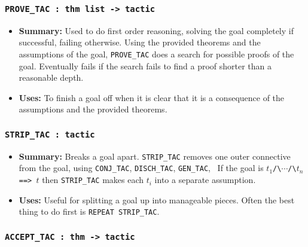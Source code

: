 \subsubsection{\tt PROVE\_TAC : thm list -> tactic}

\begin{itemize}
\item {\bf Summary:} Used to do first order reasoning, solving the
  goal completely if successful, failing otherwise.  Using the
  provided theorems and the assumptions of the goal,
  {\small\verb|PROVE_TAC|} does a search for possible proofs of the
  goal.  Eventually fails if the search fails to find a proof shorter
  than a reasonable depth.
\item {\bf Uses:} To finish a goal off when it is clear that it is a
  consequence of the assumptions and the provided theorems.
\end{itemize}


\subsubsection{\tt STRIP\_TAC : tactic}

\begin{itemize}

\item{\bf Summary:} Breaks a goal apart.  {\small\verb|STRIP_TAC|}
  removes one outer connective from the goal, using
  {\small\verb|CONJ_TAC|}, {\small\verb|DISCH_TAC|},
  {\small\verb|GEN_TAC|}, \etc\ If the goal is
$t_1${\small\verb|/\|}$\cdots${\small\verb|/\|}$t_n${\small\verb| ==> |}$t$
then {\small\verb|STRIP_TAC|} makes each $t_i$ into a separate assumption.

\item{\bf Uses:} Useful for splitting a goal up into manageable pieces.
Often the best thing to do first is {\small\verb|REPEAT STRIP_TAC|}.
\end{itemize}

\subsubsection{\tt ACCEPT\_TAC : thm -> tactic}\label{ACCEPTTAC}


